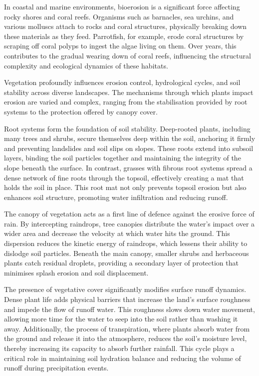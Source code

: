 In coastal and marine environments, bioerosion is a significant force affecting rocky shores and coral reefs. Organisms such as barnacles, sea urchins, and various molluscs attach to rocks and coral structures, physically breaking down these materials as they feed. Parrotfish, for example, erode coral structures by scraping off coral polyps to ingest the algae living on them. Over years, this contributes to the gradual wearing down of coral reefs, influencing the structural complexity and ecological dynamics of these habitats.

Vegetation profoundly influences erosion control, hydrological cycles, and soil stability across diverse landscapes. The mechanisms through which plants impact erosion are varied and complex, ranging from the stabilisation provided by root systems to the protection offered by canopy cover.

Root systems form the foundation of soil stability. Deep-rooted plants, including many trees and shrubs, secure themselves deep within the soil, anchoring it firmly and preventing landslides and soil slips on slopes. These roots extend into subsoil layers, binding the soil particles together and maintaining the integrity of the slope beneath the surface. In contrast, grasses with fibrous root systems spread a dense network of fine roots through the topsoil, effectively creating a mat that holds the soil in place. This root mat not only prevents topsoil erosion but also enhances soil structure, promoting water infiltration and reducing runoff.

The canopy of vegetation acts as a first line of defence against the erosive force of rain. By intercepting raindrops, tree canopies distribute the water's impact over a wider area and decrease the velocity at which water hits the ground. This dispersion reduces the kinetic energy of raindrops, which lessens their ability to dislodge soil particles. Beneath the main canopy, smaller shrubs and herbaceous plants catch residual droplets, providing a secondary layer of protection that minimises splash erosion and soil displacement.

The presence of vegetative cover significantly modifies surface runoff dynamics. Dense plant life adds physical barriers that increase the land's surface roughness and impede the flow of runoff water. This roughness slows down water movement, allowing more time for the water to seep into the soil rather than washing it away. Additionally, the process of transpiration, where plants absorb water from the ground and release it into the atmosphere, reduces the soil's moisture level, thereby increasing its capacity to absorb further rainfall. This cycle plays a critical role in maintaining soil hydration balance and reducing the volume of runoff during precipitation events.

